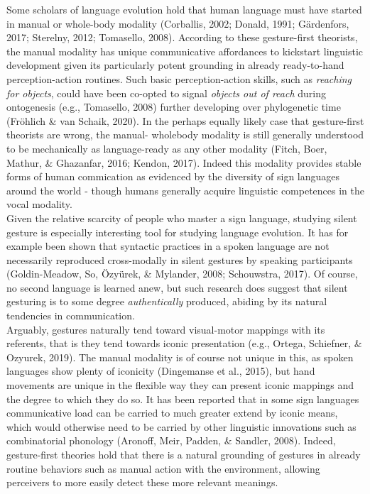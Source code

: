 \documentclass[
  man, noextraspace,floatsintext]{apa6}
\begin{document}
Some scholars of language evolution hold that human language must have started in manual or whole-body modality (Corballis, 2002; Donald, 1991; Gärdenfors, 2017; Sterelny, 2012; Tomasello, 2008). According to these gesture-first theorists, the manual modality has unique communicative affordances to kickstart linguistic development given its particularly potent grounding in already ready-to-hand perception-action routines. Such basic perception-action skills, such as \emph{reaching for objects}, could have been co-opted to signal \emph{objects out of reach} during ontogenesis (e.g., Tomasello, 2008) further developing over phylogenetic time (Fröhlich \& van Schaik, 2020). In the perhaps equally likely case that gesture-first theorists are wrong, the manual- wholebody modality is still generally understood to be mechanically as language-ready as any other modality (Fitch, Boer, Mathur, \& Ghazanfar, 2016; Kendon, 2017). Indeed this modality provides stable forms of human commication as evidenced by the diversity of sign languages around the world - though humans generally acquire linguistic competences in the vocal modality.\\
Given the relative scarcity of people who master a sign language, studying silent gesture is especially interesting tool for studying language evolution. It has for example been shown that syntactic practices in a spoken language are not necessarily reproduced cross-modally in silent gestures by speaking participants (Goldin-Meadow, So, Özyürek, \& Mylander, 2008; Schouwstra, 2017). Of course, no second language is learned anew, but such research does suggest that silent gesturing is to some degree \emph{authentically} produced, abiding by its natural tendencies in communication.\\
Arguably, gestures naturally tend toward visual-motor mappings with its referents, that is they tend towards iconic presentation (e.g., Ortega, Schiefner, \& Ozyurek, 2019). The manual modality is of course not unique in this, as spoken languages show plenty of iconicity (Dingemanse et al., 2015), but hand movements are unique in the flexible way they can present iconic mappings and the degree to which they do so. It has been reported that in some sign languages communicative load can be carried to much greater extend by iconic means, which would otherwise need to be carried by other linguistic innovations such as combinatorial phonology (Aronoff, Meir, Padden, \& Sandler, 2008). Indeed, gesture-first theories hold that there is a natural grounding of gestures in already routine behaviors such as manual action with the environment, allowing perceivers to more easily detect these more relevant meanings.\\
\end{document}
